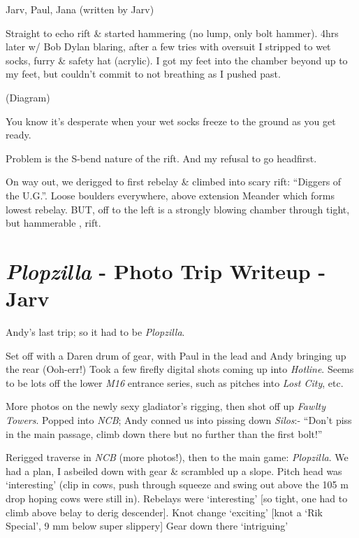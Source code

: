 Jarv, Paul, Jana (written by Jarv)

Straight to echo rift \& started hammering (no lump, only bolt hammer).
4hrs later w/ Bob Dylan blaring, after a few tries with oversuit I
stripped to wet socks, furry \& safety hat (acrylic). I got my feet into
the chamber beyond up to my feet, but couldn't commit to not breathing
as I pushed past.

(Diagram)

You know it's desperate when your wet socks freeze to the ground as you
get ready.

Problem is the S-bend nature of the rift. And my refusal to go
headfirst.

On way out, we derigged to first rebelay \& climbed into scary rift:
``Diggers of the U.G.''. Loose boulders everywhere, above extension
Meander which forms lowest rebelay. BUT, off to the left is a strongly
blowing chamber through tight, but hammerable , rift.

\hypertarget{plopzilla---photo-trip-writeup---jarv}{%
\section{\texorpdfstring{\emph{Plopzilla} - Photo Trip Writeup -
Jarv}{Plopzilla - Photo Trip Writeup - Jarv}}\label{plopzilla---photo-trip-writeup---jarv}}

Andy's last trip; so it had to be \emph{Plopzilla}.

Set off with a Daren drum of gear, with Paul in the lead and Andy
bringing up the rear (Ooh-err!) Took a few firefly digital shots coming
up into \emph{Hotline}. Seems to be lots off the lower \emph{M16}
entrance series, such as pitches into \emph{Lost City}, etc.

More photos on the newly sexy gladiator's rigging, then shot off up
\emph{Fawlty Towers}. Popped into \emph{NCB}; Andy conned us into
pissing down \emph{Silos}:- ``Don't piss in the main passage, climb down
there but no further than the first bolt!''

Rerigged traverse in \emph{NCB} (more photos!), then to the main game:
\emph{Plopzilla}. We had a plan, I asbeiled down with gear \& scrambled
up a slope. Pitch head was `interesting' (clip in cows, push through
squeeze and swing out above the 105 m drop hoping cows were still in).
Rebelays were `interesting' {[}so tight, one had to climb above belay to
derig descender{]}. Knot change `exciting' {[}knot a `Rik Special', 9 mm
below super slippery{]} Gear down there `intriguing'

